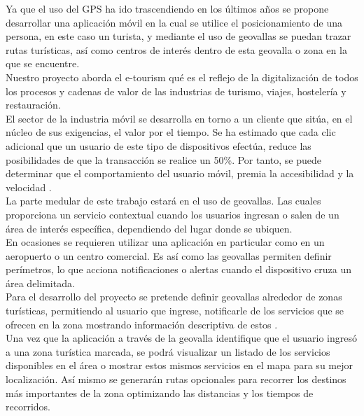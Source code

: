 \vspace*{7cm}
\rightline{{\Huge \textcolor{sectionColor}{Justificación}}}
\vspace*{2cm}


Ya que el uso del GPS ha ido trascendiendo en los últimos años se propone desarrollar una aplicación móvil en la cual se utilice el posicionamiento de una persona, en este caso un turista, y mediante el uso de geovallas se puedan trazar rutas turísticas, así como centros de interés dentro de esta geovalla o zona en la que se encuentre. \\

Nuestro proyecto aborda el e-tourism qué es el reflejo de la digitalización de todos los procesos y cadenas de valor de las industrias de turismo, viajes, hostelería y restauración. \\

El sector de la industria móvil se desarrolla en torno a un cliente que sitúa, en el núcleo de sus exigencias, el valor por el tiempo. Se ha estimado que cada clic adicional que un usuario de este tipo de dispositivos efectúa, reduce las posibilidades de que la transacción se realice un 50\%. Por tanto, se puede determinar que el comportamiento del usuario móvil, premia la accesibilidad y la velocidad \cite{mtourism}. \\

La parte medular de este trabajo estará en el uso de geovallas. Las cuales proporciona un servicio contextual cuando los usuarios ingresan o salen de un área de interés específica, dependiendo del lugar donde se ubiquen. \\

En ocasiones se requieren utilizar una aplicación en particular como en un aeropuerto o un centro comercial. Es así como las geovallas permiten definir perímetros, lo que acciona notificaciones o alertas cuando el dispositivo cruza un área delimitada.\\

Para el desarrollo del proyecto se pretende definir geovallas alrededor de zonas turísticas, permitiendo al usuario que ingrese, notificarle de los servicios que se ofrecen en la zona mostrando información descriptiva de estos \cite{mtourism}.\\

Una vez que la aplicación a través de la geovalla identifique que el usuario ingresó a una zona turística marcada, se podrá visualizar un listado de los servicios disponibles en el área o mostrar estos mismos servicios en el mapa para su mejor localización. Así mismo se generarán rutas opcionales para recorrer los destinos más importantes de la zona optimizando las distancias y los tiempos de recorridos.\\

